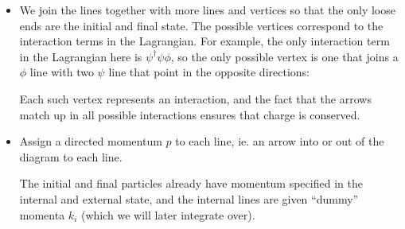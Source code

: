\documentclass[a4paper]{article}
\begin{document}
\begin{defi}
\begin{itemize}
\begin{center}
    \end{center}
  \item We join the lines together with more lines and vertices so that the only loose ends are the initial and final state. The possible vertices correspond to the interaction terms in the Lagrangian. For example, the only interaction term in the Lagrangian here is $\psi^\dagger \psi \phi$, so the only possible vertex is one that joins a $\phi$ line with two $\psi$ line that point in the opposite directions:
    \begin{center}
    \end{center}
    Each such vertex represents an interaction, and the fact that the arrows match up in all possible interactions ensures that charge is conserved.

    \item Assign a directed momentum $p$ to each line, ie. an arrow into or out of the diagram to each line.
      \begin{center}
      \end{center}
      The initial and final particles already have momentum specified in the internal and external state, and the internal lines are given ``dummy'' momenta $k_i$ (which we will later integrate over).
  \end{itemize}
\end{defi}
\end{document}

